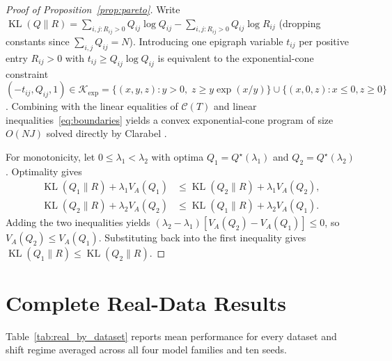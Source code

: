 \documentclass[11pt]{article}
\begin{document}
\begin{proof}[Proof of Proposition~\ref{prop:pareto}]
Write $\operatorname{KL}(Q \| R) = \sum_{i,j: R_{ij} > 0} Q_{ij}\log Q_{ij} - \sum_{i,j: R_{ij} > 0} Q_{ij}\log R_{ij}$ (dropping constants since $\sum_{i,j} Q_{ij} = N$). Introducing one epigraph variable $t_{ij}$ per positive entry $R_{ij} > 0$ with $t_{ij} \ge Q_{ij}\log Q_{ij}$ is equivalent to the exponential-cone constraint $(-t_{ij}, Q_{ij}, 1) \in \mathcal{K}_{\exp} = \{(x,y,z) : y > 0,\; z \ge y\exp(x/y)\} \cup \{(x,0,z) : x \le 0, z \ge 0\}$. Combining with the linear equalities of $\mathcal{C}(T)$ and linear inequalities~\eqref{eq:boundaries} yields a convex exponential-cone program of size $O(NJ)$ solved directly by Clarabel \citep{goulart2024clarabel}.

For monotonicity, let $0 \le \lambda_1 < \lambda_2$ with optima $Q_1 = Q^\star(\lambda_1)$ and $Q_2 = Q^\star(\lambda_2)$. Optimality gives
\begin{align*}
\operatorname{KL}(Q_1 \| R) + \lambda_1 V_A(Q_1) &\le \operatorname{KL}(Q_2 \| R) + \lambda_1 V_A(Q_2), \\
\operatorname{KL}(Q_2 \| R) + \lambda_2 V_A(Q_2) &\le \operatorname{KL}(Q_1 \| R) + \lambda_2 V_A(Q_1).
\end{align*}
Adding the two inequalities yields $(\lambda_2 - \lambda_1)[V_A(Q_2) - V_A(Q_1)] \le 0$, so $V_A(Q_2) \le V_A(Q_1)$. Substituting back into the first inequality gives $\operatorname{KL}(Q_1 \| R) \le \operatorname{KL}(Q_2 \| R)$.
\end{proof}

\clearpage
\section{Complete Real-Data Results}
\label{app:details}

Table~\ref{tab:real_by_dataset} reports mean performance for every dataset and shift regime averaged across all four model families and ten seeds.

\begingroup\footnotesize\setlength{\tabcolsep}{4pt}

\endgroup
\end{document}
